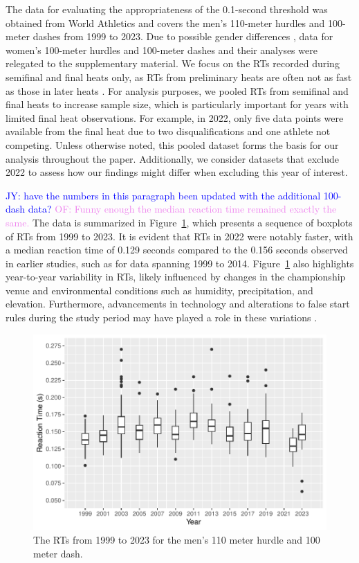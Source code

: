 \documentclass[12pt, letterpaper]{article}
\newcommand{\jy}[1]{\textcolor{blue}{JY: #1}}
\newcommand{\of}[1]{\textcolor{violet}{OF: #1}}
\begin{document}
The data for evaluating the appropriateness of the 0.1-second
threshold was obtained from World Athletics and covers the men's
110-meter hurdles and 100-meter dashes from 1999 to 2023. Due to
possible gender differences \citep{babicc2009reaction,
  lipps2011implications}, data for women's 100-meter hurdles and
100-meter dashes and their analyses were relegated to the
supplementary material. We focus on the RTs recorded during
semifinal and final heats only, as RTs from preliminary
heats are often not as fast as those in later heats
\citep[e.g.,][]{collet1999strategic, tonnessen2013reaction,
  brosnan2017effects, zhang2021correlation}. For analysis purposes, we
pooled RTs from semifinal and final heats to increase sample
size, which is particularly important for years with limited final heat
observations. For example, in 2022, only five data points were available
from the final heat due to two disqualifications and one athlete not
competing. Unless otherwise noted, this pooled dataset forms the basis
for our analysis throughout the paper. Additionally, we consider datasets
that exclude 2022 to assess how our findings might differ when excluding
this year of interest.


\jy{have the numbers in this paragraph been updated with the
  additional 100-dash data?}
  \of{Funny enough the median reaction time remained exactly the same.}
The data is summarized in Figure~\ref{fig:Boxplot}, which presents a
sequence of boxplots of RTs from 1999 to 2023. It is evident
that RTs in 2022 were notably faster, with a median reaction
time of 0.129 seconds compared to the 0.156 seconds observed in earlier
studies, such as \citet{brosnan2017effects} for data spanning 1999 to 2014.
Figure~\ref{fig:Boxplot} also highlights year-to-year variability in
RTs, likely influenced by changes in the championship venue
and environmental conditions such as humidity, precipitation, and
elevation. Furthermore, advancements in technology and alterations to
false start rules during the study period may have played a role in these
variations \citep{willwacher2013novel}.


\begin{figure}[tbp]
  \centering
  \includegraphics[width=\textwidth]{Boxplot}
  \caption{The RTs from 1999 to 2023 for the men's 110 meter hurdle
  and 100 meter dash.}
  \label{fig:Boxplot}
\end{figure}
\end{document}
